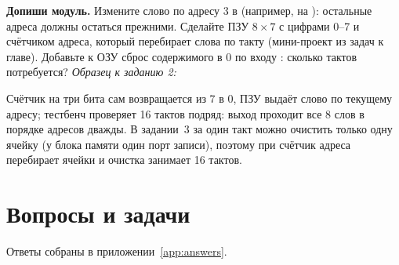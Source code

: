 \textbf{Допиши модуль.}  Измените слово по адресу 3 в
 (например, на ): остальные адреса должны остаться
прежними.  Сделайте ПЗУ $8\times7$ с цифрами 0--7 и счётчиком
адреса, который перебирает слова по такту (мини-проект из задач к главе).
 Добавьте к ОЗУ сброс содержимого в 0 по входу : сколько
тактов потребуется? \emph{Образец к заданию 2:}


Счётчик  на три бита сам возвращается из 7 в 0, ПЗУ выдаёт слово
по текущему адресу; тестбенч  проверяет 16 тактов подряд:
выход проходит все 8 слов в порядке адресов дважды. В задании~3 за один
такт можно очистить только одну ячейку (у блока памяти один порт записи),
поэтому при  счётчик адреса перебирает ячейки и очистка занимает
16 тактов.

\section{Вопросы и задачи}
\label{sec:tasks-sync}

Ответы собраны в приложении~\ref{app:answers}.

